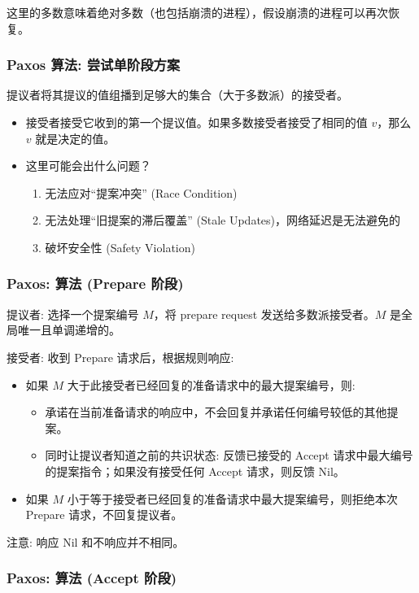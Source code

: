 这里的多数意味着绝对多数（也包括崩溃的进程），假设崩溃的进程可以再次恢复。

\subsubsection{Paxos 算法: 尝试单阶段方案}

提议者将其提议的值组播到足够大的集合（大于多数派）的接受者。
\begin{itemize}
\item 接受者接受它收到的第一个提议值。如果多数接受者接受了相同的值 $v$，那么 $v$ 就是决定的值。
\item 这里可能会出什么问题？
  \begin{enumerate}
  \item 无法应对“提案冲突” (Race Condition)
  \item 无法处理“旧提案的滞后覆盖” (Stale Updates)，网络延迟是无法避免的
  \item 破坏安全性 (Safety Violation)
  \end{enumerate}
\end{itemize}

\subsubsection{Paxos: 算法 (Prepare 阶段)}

提议者: 选择一个提案编号 $M$，将 prepare request 发送给多数派接受者。$M$ 是全局唯一且单调递增的。

接受者: 收到 Prepare 请求后，根据规则响应:
\begin{itemize}
\item 如果 $M$ 大于此接受者已经回复的准备请求中的最大提案编号，则:
  \begin{itemize}
  \item 承诺在当前准备请求的响应中，不会回复并承诺任何编号较低的其他提案。
  \item 同时让提议者知道之前的共识状态: 反馈已接受的 Accept 请求中最大编号的提案指令；如果没有接受任何 Accept 请求，则反馈 Nil。
  \end{itemize}
\item 如果 $M$ 小于等于接受者已经回复的准备请求中最大提案编号，则拒绝本次 Prepare 请求，不回复提议者。
\end{itemize}

注意: 响应 Nil 和不响应并不相同。

\subsubsection{Paxos: 算法 (Accept 阶段)}

